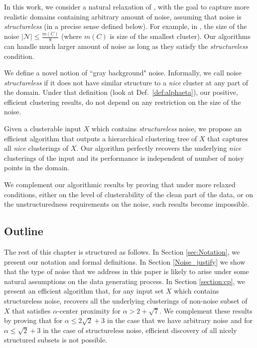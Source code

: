 \documentclass[12pt]{article}
\newcommand{\mc}{\mathcal}
\begin{document}
In this work, we consider a natural relaxation of \cite{balcan2012clustering,ben2014clustering}, with the goal to capture more realistic domains containing arbitrary amount of noise, assuming that noise is \emph{structureless} (in a precise sense defined below). For example, in \cite{balcan2012clustering}, the size of the noise $|\mc N| \le \frac{m(C)}{8}$ (where $m(C)$ is size of the smallest cluster). Our algorithms can handle much larger amount of noise as long as they satisfy the {\it structureless} condition.

We define a novel notion of ``gray background" noise. Informally, we call noise {\em structureless} if it does not have similar structure to a {\em nice} cluster at any part of the domain. Under that definition (look at Def.~\ref{def:alphaeta}), our positive, efficient clustering results, do not depend on any restriction on the size of the noise. 

Given a clusterable input $X$ which contains {\em structureless} noise, we propose an efficient algorithm that outputs a hierarchical clustering tree of $X$ that captures all {\em nice} clusterings of $X$. Our algorithm perfectly recovers the underlying {\em nice} clusterings of the input and its performance is independent of number of noisy points in the domain. 

We complement our algorithmic results by proving that under more relaxed conditions, either on the level of clusterability of the clean part of the data, or on the unstructuredness requirements on the noise, such results become impossible. 


\subsection{Outline}
The rest of this chapter is structured as follows. In Section \ref{sec:Notation}, we present our notation and formal definitions. In Section \ref{Noise_justify} we show that the type of noise that we address in this paper is likely to arise under some natural assumptions on the data generating process. In Section \ref{section:cp}, we present an efficient algorithm that, for any input set $X$ which contains structureless noise, recovers all the underlying clusterings of non-noise subset of $X$ that satisfies $\alpha$-center proximity for $\alpha > 2+\sqrt{7}$. We complement these results by proving that for $\alpha \leq 2\sqrt{2}+3$ in the case that we have arbitrary noise and for $\alpha \leq \sqrt{2}+3$ in the case of structureless noise, efficient discovery of all nicely structured subsets is not possible.
\end{document}
